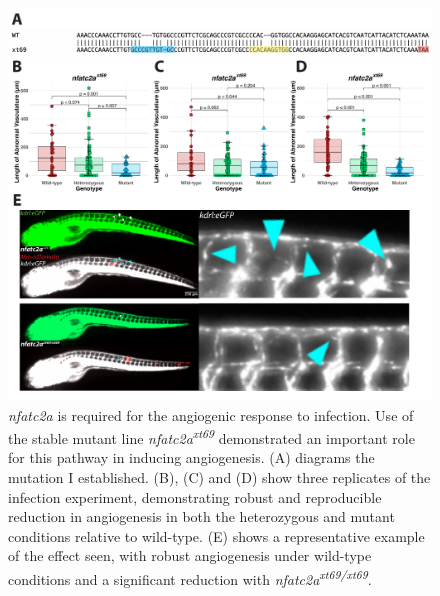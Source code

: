 \begin{figure}
\centering
\includegraphics[width=\textwidth]{images/nfatc2alarvae.pdf}
\caption{\textit{nfatc2a} is required for the angiogenic response to infection. Use of the stable mutant line \textit{nfatc2a\textsuperscript{xt69}} demonstrated an important role for this pathway in inducing angiogenesis. (A) diagrams the mutation I established. (B), (C) and (D) show three replicates of the infection experiment, demonstrating robust and reproducible reduction in angiogenesis in both the heterozygous and mutant conditions relative to wild\hyp{}type. (E) shows a representative example of the effect seen, with robust angiogenesis under wild\hyp{}type conditions and a significant reduction with \textit{nfatc2a\textsuperscript{xt69/xt69}}.}
\label{figure:c2larvae}
\end{figure}

